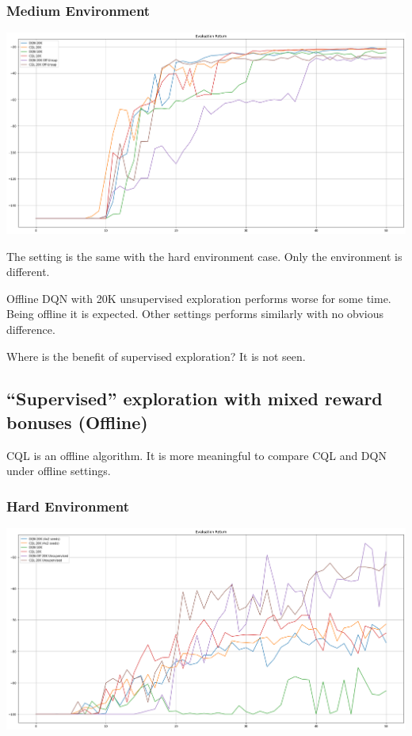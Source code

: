\documentclass[11pt]{article}
\begin{document}
    \subsubsection{Medium Environment}

    \hspace*{-0.3in}
    \includegraphics[scale=0.30]{q3-online/medium-eval}

    The setting is the same with the hard environment case.
    Only the environment is different.

    Offline DQN with 20K unsupervised exploration performs worse for some time.
    Being offline it is expected.
    Other settings performs similarly with no obvious difference.

    Where is the benefit of supervised exploration?
    It is not seen.

    \subsection{“Supervised” exploration with mixed reward bonuses (Offline)}

    CQL is an offline algorithm.
    It is more meaningful to compare CQL and DQN under offline settings.

    \subsubsection{Hard Environment}

    \hspace*{-0.3in}
    \includegraphics[scale=0.30]{q3-offline/hard-eval}
\end{document}
